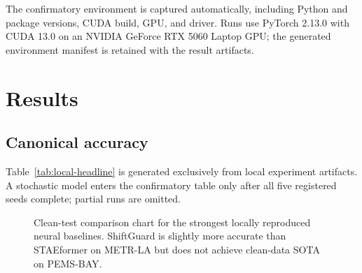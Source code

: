 \documentclass[preprint,12pt]{elsarticle}
\begin{document}
The confirmatory environment is captured automatically, including Python and
package versions, CUDA build, GPU, and driver. Runs use PyTorch 2.13.0 with CUDA
13.0 on an NVIDIA GeForce RTX 5060 Laptop GPU; the generated environment
manifest is retained with the result artifacts.

\section{Results}
\subsection{Canonical accuracy}
Table~\ref{tab:local-headline} is generated exclusively from local experiment
artifacts. A stochastic model enters the confirmatory table only after all five
registered seeds complete; partial runs are omitted.
\begin{table}[t]
  \centering
  \caption{Locally reproduced canonical-test results. Empty uncertainty cells
  indicate that only one deterministic run is applicable or currently complete.}
  \label{tab:local-headline}
  \resizebox{\textwidth}{!}{}
\end{table}

\begin{figure}[t]
  \centering
  \caption{Clean-test comparison chart for the strongest locally reproduced
  neural baselines. ShiftGuard is slightly more accurate than STAEformer on
  METR-LA but does not achieve clean-data SOTA on PEMS-BAY.}
  \label{fig:clean-comparison}
\end{figure}
\end{document}
